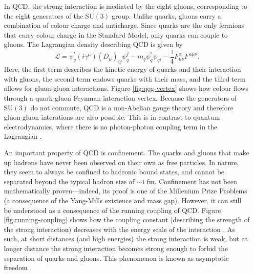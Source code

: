 \documentclass[12pt,a4paper]{report}
\begin{document}
In QCD, the strong interaction is mediated by the eight gluons, corresponding to the eight generators of the $\text{SU}(3)$ group. Unlike quarks, gluons carry a combination of colour charge and anticharge. Since quarks are the only fermions that carry colour charge in the Standard Model, only quarks can couple to gluons. The Lagrangian density describing QCD is given by
\begin{equation}
  \mathcal{L} = \bar{\psi}_q^i (i \gamma^\mu) (D_\mu)_{ij} \psi_q^j - m_q \bar{\psi}^i_q \psi_{qi} - \frac{1}{4} F_{\mu\nu}^\alpha F^{\alpha\mu\nu}.
\end{equation}
Here, the first term describes the kinetic energy of quarks and their interaction with gluons, the second term endows quarks with their mass, and the third term allows for gluon-gluon interactions. Figure \ref{fig:qqg-vertex} shows how colour flows through a quark-gluon Feynman interaction vertex. Because the generators of $\text{SU}(3)$ do not commute, QCD is a non-Abelian gauge theory and therefore gluon-gluon interations are also possible. This is in contrast to quantum electrodynamics, where there is no photon-photon coupling term in the Lagrangian \cite{thomson_modern_2013, ellis_qcd_1996, navas_review_2024}.

An important property of QCD is confinement. The quarks and gluons that make up hadrons have never been observed on their own as free particles. In nature, they seem to always be confined to hadronic bound states, and cannot be separated beyond the typical hadron size of $\sim \qty{1}{\femto\meter}$. Confinement has not been mathematically proven---indeed, its proof is one of the Millenium Prize Problems (a consequence of the Yang-Mills existence and mass gap). However, it can still be understood as a consequence of the running coupling of QCD. Figure \ref{fig:running-coupling} shows how the coupling constant (describing the strength of the strong interaction) decreases with the energy scale of the interaction \cite{navas_review_2024}. As such, at short distances (and high energies) the strong interaction is weak, but at longer distance the strong interaction becomes strong enough to forbid the separation of quarks and gluons. This phenomenon is known as asymptotic freedom \cite{Gross:1973ju,Politzer:1974fr}.
\end{document}
